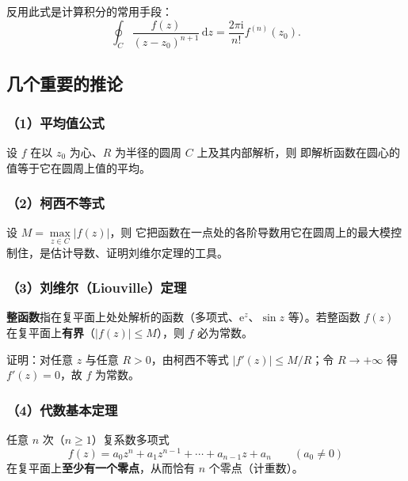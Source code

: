 反用此式是计算积分的常用手段：
\[
\oint_{C}\frac{f(z)}{(z-z_{0})^{n+1}}\,\mathrm{d}z=\frac{2\pi\mathrm{i}}{n!}f^{(n)}(z_{0}).
\]


\subsection{几个重要的推论}
\subsubsection*{（1）平均值公式}
设 \(f\) 在以 \(z_{0}\) 为心、\(R\) 为半径的圆周 \(C\) 上及其内部解析，则
即解析函数在圆心的值等于它在圆周上值的平均。

\subsubsection*{（2）柯西不等式}
设 \(M=\max\limits_{z\in C}|f(z)|\)，则
它把函数在一点处的各阶导数用它在圆周上的最大模控制住，是估计导数、证明刘维尔定理的工具。

\subsubsection*{（3）刘维尔（Liouville）定理}
\textbf{整函数}指在复平面上处处解析的函数（多项式、\(\mathrm{e}^{z}\)、\(\sin z\) 等）。若整函数 \(f(z)\) 在复平面上\textbf{有界}（\(|f(z)|\leqslant M\)），则 \(f\) 必为常数。

证明：对任意 \(z\) 与任意 \(R>0\)，由柯西不等式 \(|f'(z)|\leqslant M/R\)；令 \(R\to+\infty\) 得 \(f'(z)=0\)，故 \(f\) 为常数。

\subsubsection*{（4）代数基本定理}
任意 \(n\) 次（\(n\geqslant 1\)）复系数多项式
\[
f(z)=a_{0}z^{n}+a_{1}z^{n-1}+\cdots+a_{n-1}z+a_{n}\qquad (a_{0}\neq 0)
\]
在复平面上\textbf{至少有一个零点}，从而恰有 \(n\) 个零点（计重数）。

